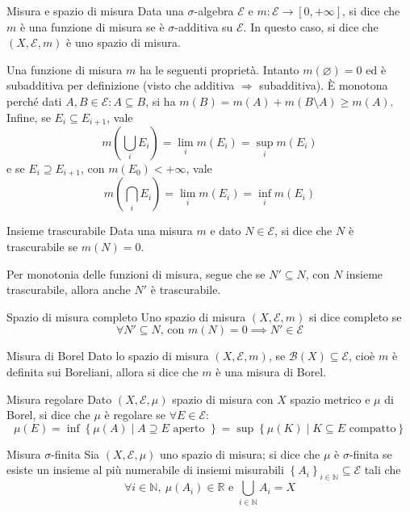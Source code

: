 \documentclass[11pt, a4paper]{scrartcl}
\theoremstyle{definition}
\numberwithin{esempio}{section}
\theoremstyle{definition}
\numberwithin{obs}{section}
\numberwithin{nota}{section}
\numberwithin{equation}{subsection}
\begin{document}
\begin{definizione}
	{Misura e spazio di misura}{}
	Data una $\sigma $-algebra $\mathcal{E} $ e $m:\mathcal{E} \to [0,+\infty]$, si dice che $m$ \`e una funzione di misura se \`e $\sigma $-additiva su $\mathcal{E} $.
	In questo caso, si dice che $(X,\mathcal{E} ,m)$ \`e uno spazio di misura.
\end{definizione}
\noindent Una funzione di misura $m$ ha le seguenti propriet\`a.
Intanto $m(\varnothing) = 0$ ed \`e subadditiva per definizione (visto che additiva $\Rightarrow $ subadditiva).
\`E monotona perch\'e dati $A,B \in \mathcal{E} : A\subseteq B$, si ha $m(B) = m(A) + m(B \setminus A)\ge m(A)$.
Infine, se $E_i \subseteq E_{i+1}$, vale
\begin{equation}
	m\left(\bigcup_{i} E_i\right) = \lim_{i} m(E_i) = \sup_i m(E_i)
\end{equation}
e se $E_i \supseteq E_{i+1} $, con $m(E_0) < +\infty$, vale
\begin{equation}
	m\left(\bigcap_i E_i\right) = \lim_{i} m(E_i) = \inf_i m(E_i)
\end{equation}
\begin{definizione}
	{Insieme trascurabile}{}
	Data una misura $m$ e dato $N \in \mathcal{E}$, si dice che $N$ \`e trascurabile se $m(N) = 0$.
\end{definizione}
\noindent Per monotonia delle funzioni di misura, segue che se $N' \subseteq N$, con $N$ insieme trascurabile, allora anche $N'$ \`e trascurabile.
\begin{definizione}
	{Spazio di misura completo}{}
	Uno spazio di misura $(X,\mathcal{E} ,m)$ si dice completo se
	\begin{equation*}
		\forall N' \subseteq N\text{, con } m(N) = 0\implies N' \in \mathcal{E} 
	\end{equation*}
\end{definizione}
\begin{definizione}
	{Misura di Borel}{}
	Dato lo spazio di misura $(X,\mathcal{E} ,m)$, se $\mathcal{B} (X) \subseteq \mathcal{E} $, cio\`e $m$ \`e definita sui Boreliani, allora si dice che $m$ \`e una misura di Borel.
\end{definizione}
\begin{definizione}
	{Misura regolare}{}
	Dato $(X,\mathcal{E} ,\mu )$ spazio di misura con $X$ spazio metrico e $\mu $ di Borel, si dice che $\mu $ \`e regolare se $\forall E \in \mathcal{E} $:
	\[
	\mu (E) = \inf \left\{ \mu (A)  \mid A\supseteq E \text{ aperto }\right\}  = \sup \left\{ \mu (K)  \mid K \subseteq E \text{ compatto} \right\} 
	\] 
\end{definizione}
\begin{definizione}
	{Misura $\sigma $-finita}{}
	Sia $(X,\mathcal{E} ,\mu )$ uno spazio di misura; si dice che $\mu $ \`e $\sigma $-finita se esiste un insieme al pi\`u numerabile di insiemi misurabili $\left\{ A_i \right\} _{i\in \mathbb{N}} \subseteq \mathcal{E} $ tali che
	\[
	\forall i \in \mathbb{N}, \ \mu (A_i) \in \mathbb{R} \text{ e } \bigcup_{i\in \mathbb{N}} A_i = X
	\] 
\end{definizione}
\end{document}
